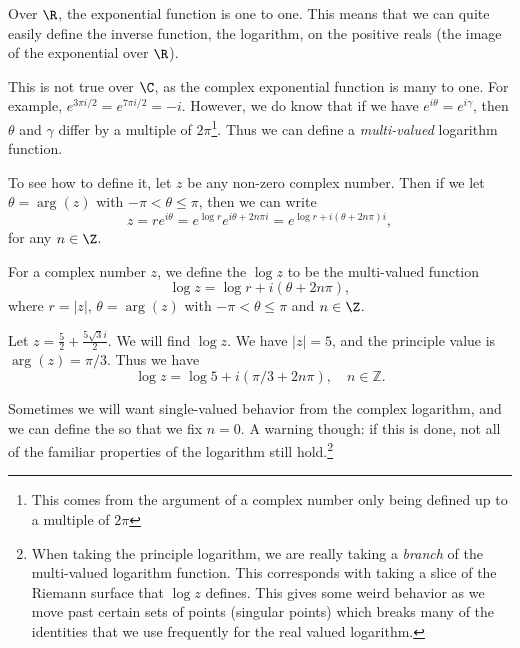 \documentclass[a4paper]{scrreprt}
\begin{document}
Over $\R$, the exponential function is one to one. This means that we can quite easily define the inverse function, the logarithm, on the positive reals (the image of the exponential over $\R$).

This is not true over $\C$, as the complex exponential function is many to one. For example, $e^{3\pi i/2} = e^{7 \pi i/2} = -i$. However, we do know that if we have $e^{i\theta} = e^{i \gamma}$, then $\theta$ and $\gamma$ differ by a multiple of $2 \pi$\footnote{This comes from the argument of a complex number only being defined up to a multiple of $2\pi$}. Thus we can define a \emph{multi-valued} logarithm function.

To see how to define it, let $z$ be any non-zero complex number. Then if we let $\theta = \arg(z)$ with $-\pi < \theta \leq \pi$, then we can write
$$
z = re^{i \theta} =  e^{\log r} e^{i \theta + 2n \pi i} = e^{\log r + i(\theta + 2n \pi)i},
$$
for any $n \in \Z$.

\begin{definition}
	For a complex number $z$, we define the  $\log z$ to be the multi-valued function
	$$
	\log z = \log r + i(\theta + 2n\pi),
	$$
	where $r = |z|$, $\theta = \arg (z)$ with $- \pi < \theta \leq \pi$ and $n \in \Z$.
\end{definition}

\begin{example}
	Let $z = \frac{5}{2} + \frac{5\sqrt{3} i}{2}$. We will find $\log z$. We have $|z| = 5$, and the principle value is $\arg(z) = \pi/3$. Thus we have
	$$
	\log z = \log 5 + i (\pi/3 + 2n \pi), \quad n \in \mathbb{Z}.
	$$
\end{example}

Sometimes we will want single-valued behavior from the complex logarithm, and we can define the  so that we fix $n = 0$. A warning though: if this is done, not all of the familiar properties of the logarithm still hold.\footnote{When taking the principle logarithm, we are really taking a \emph{branch} of the multi-valued logarithm function. This corresponds with taking a slice of the Riemann surface that $\log z$ defines. This gives some weird behavior as we move past certain sets of points (singular points) which breaks many of the identities that we use frequently for the real valued logarithm.}
\end{document}
